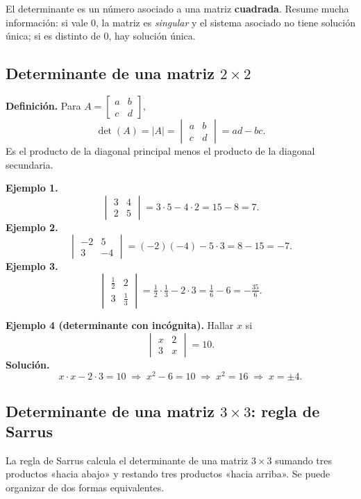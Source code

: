 \documentclass[12pt, letterpaper]{article}
\newcommand{\mwmat}[1]{\ensuremath{\begin{bmatrix}#1\end{bmatrix}}}
\newcommand{\mwdet}[1]{\ensuremath{\begin{vmatrix}#1\end{vmatrix}}}
\begin{document}
El determinante es un número asociado a una matriz \textbf{cuadrada}. Resume
mucha información: si vale $0$, la matriz es \emph{singular} y el sistema
asociado no tiene solución única; si es distinto de $0$, hay solución única.

\subsection{Determinante de una matriz $2\times2$}

\begin{cuadroteoria}
  \small
  \textbf{Definición.} Para
  $A=\mwmat{a&b\\c&d}$,
  \[
    \det(A)=|A|=\mwdet{a&b\\c&d}=ad-bc.
  \]
  Es el producto de la diagonal principal menos el producto de la diagonal
  secundaria.
\end{cuadroteoria}

\begin{cuadrosolucion}
  \small
  \textbf{Ejemplo 1.}
  \[
    \mwdet{3&4\\2&5}=3\cdot5-4\cdot2=15-8=7.
  \]
  \textbf{Ejemplo 2.}
  \[
    \mwdet{-2&5\\3&-4}=(-2)(-4)-5\cdot3=8-15=-7.
  \]
  \textbf{Ejemplo 3.}
  \[
    \mwdet{\tfrac12&2\\[2pt]3&\tfrac13}
    =\tfrac12\cdot\tfrac13-2\cdot3
    =\tfrac16-6=-\tfrac{35}{6}.
  \]
\end{cuadrosolucion}

\begin{cuadrosolucion}
  \small
  \textbf{Ejemplo 4 (determinante con incógnita).} Hallar $x$ si
  \[
    \mwdet{x&2\\3&x}=10.
  \]
  \textbf{Solución.}
  \[
    x\cdot x-2\cdot3=10
    \;\Rightarrow\;
    x^2-6=10
    \;\Rightarrow\;
    x^2=16
    \;\Rightarrow\;
    x=\pm4.
  \]
\end{cuadrosolucion}

\subsection{Determinante de una matriz $3\times3$: regla de Sarrus}

La regla de Sarrus calcula el determinante de una matriz $3\times3$ sumando
tres productos «hacia abajo» y restando tres productos «hacia arriba». Se
puede organizar de dos formas equivalentes.
\end{document}
